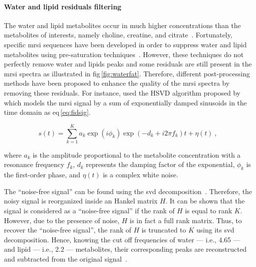 \paragraph{Water and lipid residuals filtering} The water and lipid metabolites occur in much higher concentrations than the metabolites of interests, namely choline, creatine, and citrate~\cite{Zhu2010,Osorio-Garcia2012}.
Fortunately, specific \ac{mrsi} sequences have been developed in order to suppress water and lipid metabolites using pre-saturation techniques~\cite{Zhu2010}.
However, these techniques do not perfectly remove water and lipids peaks and some residuals are still present in the \ac{mrsi} spectra as illustrated in \ac{fig}\,\ref{fig:waterfat}.
Therefore, different post-processing methods have been proposed to enhance the quality of the \ac{mrsi} spectra by removing these residuals.
For instance, \citeauthor{Kelm2007} used the HSVD algorithm proposed by \citeauthor{Pijnappel1992} which models the \ac{mrsi} signal by a sum of exponentially damped sinusoids in the time domain as \acs{eq}\,\eqref{eq:fidsig}.

\begin{equation}
	s(t) = \sum_{k=1}^{K} a_{k}\exp(i \phi_k) \exp( -d_{k} + i 2 \pi f_{k} ) t + \eta(t) \ ,
	\label{eq:fidsig}
\end{equation}

\noindent where $a_k$ is the amplitude proportional to the metabolite concentration with a resonance frequency $f_{k}$, $d_k$ represents the damping factor of the exponential, $\phi_k$ is the first-order phase, and $\eta(t)$ is a complex white noise.

The ``noise-free signal'' can be found using the \ac{svd} decomposition~\cite{Pijnappel1992}.
Therefore, the noisy signal is reorganized inside an Hankel matrix $H$.
It can be shown that the signal is considered as a ``noise-free signal'' if the rank of $H$ is equal to rank $K$.
However, due to the presence of noise, $H$ is in fact a full rank matrix.
Thus, to recover the ``noise-free signal'', the rank of $H$ is truncated to $K$ using its \ac{svd} decomposition.
Hence, knowing the cut off frequencies of water --- i.e., \SI{4.65}{\ppm} --- and lipid --- i.e., \SI{2.2}{\ppm} --- metabolites, their corresponding peaks are reconstructed and subtracted from the original signal~\cite{Laudadio2002}.
	

